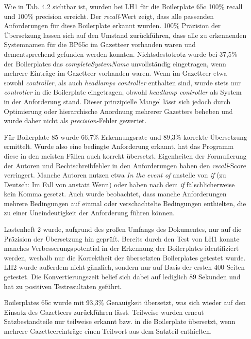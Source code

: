 \documentclass[12pt]{report}
\begin{document}
Wie in Tab. 4.2 sichtbar ist, wurden bei LH1 für die Boilerplate 65c 100\% recall und 100\% precision erreicht. Der \textit{recall}-Wert zeigt, dass alle passenden Anforderungen für diese Boilerplate erkannt wurden. 100\% Präzision der Übersetzung lassen sich auf den Umstand zurückführen, dass alle zu erkennenden Systemnamen für die BP65c im Gazetteer vorhanden waren und dementsprechend gefunden werden konnten. Nichtsdestotrotz wurde bei 37,5\% der Boilerplates das \textit{completeSystemName} unvollständig eingetragen, wenn mehrere Einträge im Gazetteer vorhanden waren. Wenn im Gazetteer etwa sowohl \textit{controller}, als auch \textit{headlamps controller} enthalten sind, wurde stets nur \textit{controller} in die Boilerplate eingetragen, obwohl \textit{headlamp controller} als System in der Anforderung stand. Dieser prinzipielle Mangel lässt sich jedoch durch Optimierung oder hierarchische Anordnung mehrerer Gazetters beheben und wurde daher nicht als \textit{precision}-Fehler gewertet.

Für Boilerplate 85 wurde 66,7\% Erkennungsrate und 89,3\% korrekte Übersetzung ermittelt. Wurde also eine bedingte Anforderung erkannt, hat das Programm diese in den meisten Fällen auch korrekt übersetzt. Eigenheiten der Formulierung der Autoren und Rechtschreibfehler in den Anforderungen haben den \textit{recall}-Score verringert. Manche Autoren nutzen etwa \glqq \textit{In the event of}\grqq{} anstelle von \glqq \textit{if}\grqq{} (zu Deutsch: \glqq Im Fall von\grqq{} anstatt \glqq Wenn\grqq{}) oder haben nach dem \textit{if} fälschlicherweise kein Komma gesetzt. Auch wurde beobachtet, dass manche Anforderungen mehrere Bedingungen auf einmal oder verschachtelte Bedingungen enthielten, die zu einer Uneindeutigkeit der Anforderung führen können.

\vspace{12pt}
Lastenheft 2 wurde, aufgrund des großen Umfangs des Dokumentes, nur auf die Präzision der Übersetzung hin geprüft. Bereits durch den Test von LH1 konnte manches Verbesserungspotential in der Erkennung der Boilerplates identifiziert werden, weshalb nur die Korrektheit der übersetzten Boilerplates getestet wurde. LH2 wurde außerdem nicht gänzlich, sondern nur auf Basis der ersten 400 Seiten getestet. Die Konvertierungszeit belief sich dabei auf lediglich 89 Sekunden und hat zu positiven Testresultaten geführt.

Boilerplates 65c wurde mit 93,3\% Genauigkeit übersetzt, was sich wieder auf den Einsatz des Gazetteers zurückführen lässt. Teilweise wurden erneut Satzbestandteile nur teilweise erkannt bzw. in die Boilerplate übersetzt, wenn mehrere Gazetteereinträge einen Teilwort aus dem Satzteil enthielten.
\end{document}

